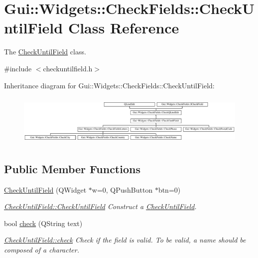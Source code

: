 \hypertarget{classGui_1_1Widgets_1_1CheckFields_1_1CheckUntilField}{\section{Gui\-:\-:Widgets\-:\-:Check\-Fields\-:\-:Check\-Until\-Field Class Reference}
\label{classGui_1_1Widgets_1_1CheckFields_1_1CheckUntilField}
}


The \hyperlink{classGui_1_1Widgets_1_1CheckFields_1_1CheckUntilField}{Check\-Until\-Field} class.  




{\ttfamily \#include $<$checkuntilfield.\-h$>$}

Inheritance diagram for Gui\-:\-:Widgets\-:\-:Check\-Fields\-:\-:Check\-Until\-Field\-:\begin{figure}[H]
\begin{center}
\leavevmode
\includegraphics[height=2.508961cm]{d4/d37/classGui_1_1Widgets_1_1CheckFields_1_1CheckUntilField}
\end{center}
\end{figure}
\subsection*{Public Member Functions}
\begin{DoxyCompactItemize}
\item 
\hyperlink{classGui_1_1Widgets_1_1CheckFields_1_1CheckUntilField_a351fcf364f4ca3b2b4da806e6e5cf185}{Check\-Until\-Field} (Q\-Widget $\ast$w=0, Q\-Push\-Button $\ast$btn=0)
\begin{DoxyCompactList}\small\item\em \hyperlink{classGui_1_1Widgets_1_1CheckFields_1_1CheckUntilField_a351fcf364f4ca3b2b4da806e6e5cf185}{Check\-Until\-Field\-::\-Check\-Until\-Field} Construct a \hyperlink{classGui_1_1Widgets_1_1CheckFields_1_1CheckUntilField}{Check\-Until\-Field}. \end{DoxyCompactList}\item 
bool \hyperlink{classGui_1_1Widgets_1_1CheckFields_1_1CheckUntilField_ad8d3923aa32bbcba0d73bb4240fe96e8}{check} (Q\-String text)
\begin{DoxyCompactList}\small\item\em \hyperlink{classGui_1_1Widgets_1_1CheckFields_1_1CheckUntilField_ad8d3923aa32bbcba0d73bb4240fe96e8}{Check\-Until\-Field\-::check} Check if the field is valid. To be valid, a name should be composed of a character. \end{DoxyCompactList}\end{DoxyCompactItemize}
